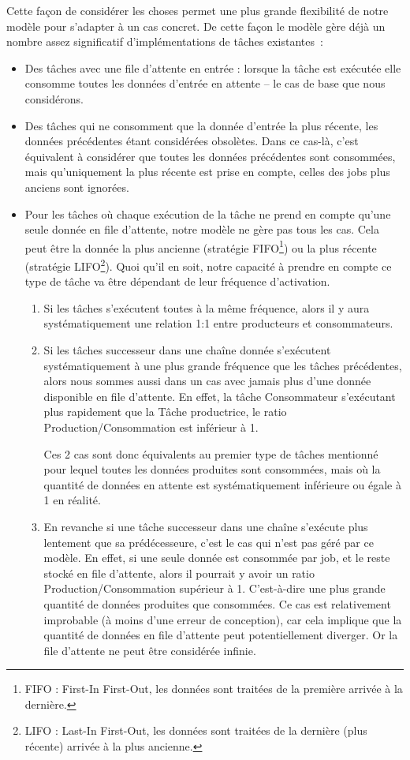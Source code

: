 \documentclass[french, a4paper, 11pt, twoside, pdftex]{StyleThese}
\begin{document}
  		 Cette façon de considérer les choses permet une plus grande flexibilité de notre modèle pour s'adapter à un cas concret. De cette façon le modèle gère déjà un nombre assez significatif d'implémentations de tâches existantes~:
	\begin{itemize}
		\item   		Des tâches avec une file d'attente en entrée : lorsque la tâche est exécutée elle consomme toutes les données d'entrée en attente -- le cas de base que nous considérons.
		\item   		Des tâches qui ne consomment que la donnée d'entrée la plus récente, les données précédentes étant considérées obsolètes. Dans ce cas-là, c'est équivalent à considérer que toutes les données précédentes sont consommées, mais qu'uniquement la plus récente est prise en compte, celles des jobs plus anciens sont ignorées.
		\item   		Pour les tâches où chaque exécution de la tâche ne prend en compte qu'une seule donnée en file d'attente, notre modèle ne gère pas tous les cas. Cela peut être la donnée la plus ancienne (stratégie FIFO\footnote{FIFO : First-In First-Out, les données sont traitées de la première arrivée à la dernière.}) ou la plus récente (stratégie LIFO\footnote{LIFO : Last-In First-Out, les données sont traitées de la dernière (plus récente) arrivée à la plus ancienne.}). Quoi qu'il en soit, notre capacité à prendre en compte ce type de tâche va être dépendant de leur fréquence d'activation. 
		\begin{enumerate}
			\item 	Si les tâches s'exécutent toutes à la même fréquence, alors il y aura systématiquement une relation 1\string:1 entre producteurs et consommateurs.
			\item 	Si les tâches successeur dans une chaîne donnée s'exécutent systématiquement à une plus grande fréquence que les tâches précédentes, alors nous sommes aussi dans un cas avec jamais plus d'une donnée disponible en file d'attente. En effet, la tâche Consommateur s'exécutant plus rapidement que la Tâche productrice, le ratio Production/Consommation est inférieur à 1.
		
		Ces 2 cas sont donc équivalents au premier type de tâches mentionné pour lequel toutes les données produites sont consommées, mais où la quantité de données en attente est systématiquement inférieure ou égale à 1 en réalité.
			\item 	En revanche si une tâche successeur dans une chaîne s'exécute plus lentement que sa prédécesseure, c'est le cas qui n'est pas géré par ce modèle. En effet, si une seule donnée est consommée par job, et le reste stocké en file d'attente, alors il pourrait y avoir un ratio Production/Consommation supérieur à 1. C'est-à-dire une plus grande quantité de données produites que consommées. Ce cas est relativement improbable (à moins d'une erreur de conception), car cela implique que la quantité de données en file d'attente peut potentiellement diverger. Or la file d'attente ne peut être considérée infinie.
		\end{enumerate}  
	\end{itemize}
\end{document}
